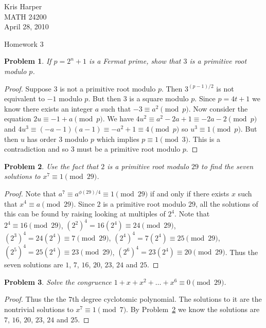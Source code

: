 \documentclass{article}
\newtheorem{problem}{Problem}
\begin{document}
\begin{flushright}
Kris Harper\\

MATH 24200\\

April 28, 2010
\end{flushright}

\begin{center}
Homework 3
\end{center}

\begin{problem}
If $p = 2^n + 1$ is a Fermat prime, show that $3$ is a primitive root modulo $p$.
\end{problem}
\begin{proof}
Suppose $3$ is not a primitive root modulo $p$. Then $3^{(p-1)/2}$ is not equivalent to  $-1$ modulo $p$. But then $3$ is a square modulo $p$. Since $p = 4t + 1$ we know there exists an integer $a$ such that $-3 \equiv a^2 \pmod{p}$. Now consider the equation $2u \equiv -1 + a \pmod{p}$. We have $4u^2 \equiv a^2 - 2a + 1 \equiv -2a-2 \pmod{p}$ and $4u^3 \equiv (-a - 1)(a-1) \equiv -a^2 + 1 \equiv 4 \pmod{p}$ so $u^3 \equiv 1 \pmod{p}$. But then $u$ has order $3$ modulo $p$ which implies $p \equiv 1 \pmod{3}$. This is a contradiction and so $3$ must be a primitive root modulo $p$.
\end{proof}

\begin{problem}
\label{7th}
Use the fact that $2$ is a primitive root modulo $29$ to find the seven solutions to $x^7 \equiv 1 \pmod{29}$.
\end{problem}
\begin{proof}
Note that $a^7 \equiv a^{\phi(29)/4} \equiv 1 \pmod{29}$ if and only if there exists $x$ such that $x^4 \equiv a \pmod{29}$. Since $2$ is a primitive root modulo $29$, all the solutions of this can be found by raising looking at multiples of $2^4$. Note that $2^4 \equiv 16 \pmod{29}$, $(2^2)^4 = 16(2^4) \equiv 24 \pmod{29}$, $(2^3)^4 = 24(2^4) \equiv 7 \pmod{29}$, $(2^4)^4 = 7(2^4) \equiv 25 \pmod{29}$, $(2^5)^4 = 25(2^4) \equiv 23 \pmod{29}$, $(2^6)^4 = 23(2^4) \equiv 20 \pmod{29}$. Thus the seven solutions are $1$, $7$, $16$, $20$, $23$, $24$ and $25$.
\end{proof}

\begin{problem}
Solve the congruence $1 + x + x^2 + \dots + x^6 \equiv 0 \pmod{29}$.
\end{problem}
\begin{proof}
Thus the the $7$th degree cyclotomic polynomial. The solutions to it are the nontrivial solutions to $x^7 \equiv 1 \pmod{7}$. By Problem~\ref{7th} we know the solutions are $7$, $16$, $20$, $23$, $24$ and $25$.
\end{proof}
\end{document}
